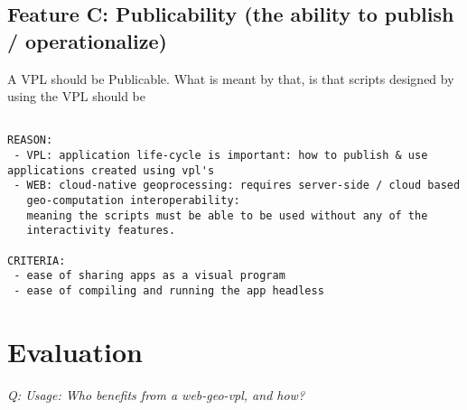 \subsection*{Feature C: Publicability (the ability to publish / operationalize) } 

A VPL should be Publicable. What is meant by that, is that scripts designed by using the VPL should be 

\begin{lstlisting}

REASON: 
 - VPL: application life-cycle is important: how to publish & use applications created using vpl's
 - WEB: cloud-native geoprocessing: requires server-side / cloud based
   geo-computation interoperability: 
   meaning the scripts must be able to be used without any of the 
   interactivity features.

CRITERIA:
 - ease of sharing apps as a visual program
 - ease of compiling and running the app headless
\end{lstlisting}









\section{Evaluation}

\emph{Q: Usage: Who benefits from a web-geo-vpl, and how?  }

